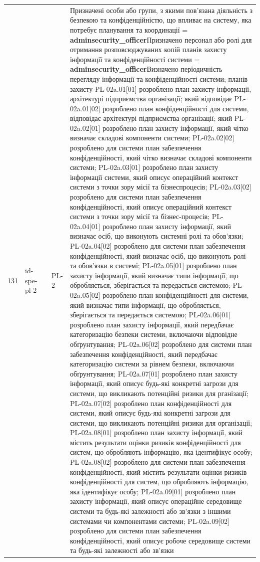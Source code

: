 \documentclass[10pt]{article}
\begin{document}
\begin{longtable}{|c|>{\raggedright\arraybackslash}p{2.5cm}|>{\raggedright\arraybackslash}p{4.5cm}|>{\raggedright\arraybackslash}p{3cm}|>{\raggedright\arraybackslash}p{4.5cm}|}
131 & id-spe-pl-2 &  & PL-2 & Призначені особи або групи, з якими пов'язана діяльність з безпекою та конфіденційністю, що впливає на систему, яка потребує планування та координації = \textbf{adminsecurity\_\allowbreak{}officer}\newline Призначено персонал або ролі для отримання розповсюджуваних копій планів захисту інформації та конфіденційності системи = \textbf{adminsecurity\_\allowbreak{}officer}\newline Визначено періодичність перегляду інформації та конфіденційності системи; планів захисту PL-02a.01[01] розроблено план захисту інформації, архітектурі підприємства організації; який відповідає PL-02a.01[02] розроблено план конфіденційності для системи, відповідає архітектурі підприємства організації; який PL-02a.02[01] розроблено план захисту інформації, який чітко визначає складові компоненти системи; PL-02a.02[02] розроблено для системи план забезпечення конфіденційності, який чітко визначає складові компоненти системи; PL-02a.03[01] розроблено план захисту інформації системи, який описує операційний контекст системи з точки зору місії та бізнеспроцесів; PL-02a.03[02] розроблено для системи план забезпечення конфіденційності, який описує операційний контекст системи з точки зору місії та бізнес-процесів; PL-02a.04[01] розроблено план захисту інформації, який визначає осіб, що виконують системні ролі та обов'язки; PL-02a.04[02] розроблено для системи план забезпечення конфіденційності, який визначає осіб, що виконують ролі та обов'язки в системі; PL-02a.05[01] розроблено план захисту інформації, який визначає типи інформації, що обробляється, зберігається та передається системою; PL-02a.05[02] розроблено план конфіденційності для системи, який визначає типи інформації, що обробляється, зберігається та передається системою; PL-02a.06[01] розроблено план захисту інформації, який передбачає категоризацію безпеки системи, включаючи відповідне обґрунтування; PL-02a.06[02] розроблено для системи план забезпечення конфіденційності, який передбачає категоризацію системи за рівнем безпеки, включаючи обґрунтування; PL-02a.07[01] розроблено план захисту інформації, який описує будь-які конкретні загрози для системи, що викликають потенційні ризики для рганізації; PL-02a.07[02] розроблено план конфіденційності для системи, який описує будь-які конкретні загрози для системи, що викликають потенційні ризики для організації; PL-02a.08[01] розроблено план захисту інформації, який містить результати оцінки ризиків конфіденційності для систем, що обробляють інформацію, яка ідентифікує особу; PL-02a.08[02] розроблено для системи план забезпечення конфіденційності, який містить результати оцінки ризиків конфіденційності для систем, що обробляють інформацію, яка ідентифікує особу; PL-02a.09[01] розроблено план захисту інформації, який описує операційне середовище системи та будь-які залежності або зв'язки з іншими системами чи компонентами системи; PL-02a.09[02] розроблено для системи план забезпечення конфіденційності, який описує робоче середовище системи та будь-які залежності або зв'язки 
\end{longtable}
\end{document}
